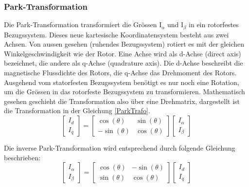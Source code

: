 \subsubsection*{Park-Transformation}
Die Park-Transformation transformiert die Grössen I$_{\alpha}$ und I$_{\beta}$ in ein rotorfestes Bezugssystem\cite{leiserEffizienterBLDC}. Dieses neue kartesische Koordinatensystem besteht aus zwei Achsen. Von aussen gesehen (ruhendes Bezugssystem) rotiert es mit der gleichen Winkelgeschwindigkeit wie der Rotor. Eine Achse wird als d-Achse (direct axis) bezeichnet, die andere als q-Achse (quadrature axis). Die d-Achse beschreibt die magnetische Flussdichte des Rotors, die q-Achse das Drehmoment des Rotors. \\
Ausgehend vom statorfesten Bezugssystem benötigt es nur noch eine Rotation, um die Grössen in das rotorfeste Bezugssystem zu transformieren\cite{dqTrafo_Wiki}. Mathematisch gesehen geschieht die Transformation also über eine Drehmatrix, dargestellt ist die Transformation in der Gleichung \ref{ParkTrafo}. 
\begin{equation}\label{ParkTrafo}
\left[
\begin{array}{c}
I_d \\ 
I_q
\end{array} 
\right]
= 
\left[
\begin{array}{cc}
\cos (\theta) & \sin(\theta) \\
-\sin(\theta)  & \cos(\theta)
\end{array} 
\right] 
\left[
\begin{array}{c}
I_\alpha \\ 
I_\beta
\end{array} 
\right]
\end{equation}

Die inverse Park-Transformation wird entsprechend durch folgende Gleichung beschrieben:
\begin{equation}\label{invParkTrafo}
\left[
\begin{array}{c}	
I_\alpha \\ 
I_\beta
\end{array} 
\right]
= 
\left[
\begin{array}{cc}
\cos (\theta) & -\sin(\theta) \\
\sin(\theta)  & \cos(\theta)
\end{array} 
\right] 
\left[
\begin{array}{c}
I_d \\ 
I_q
\end{array} 
\right]
\end{equation}

